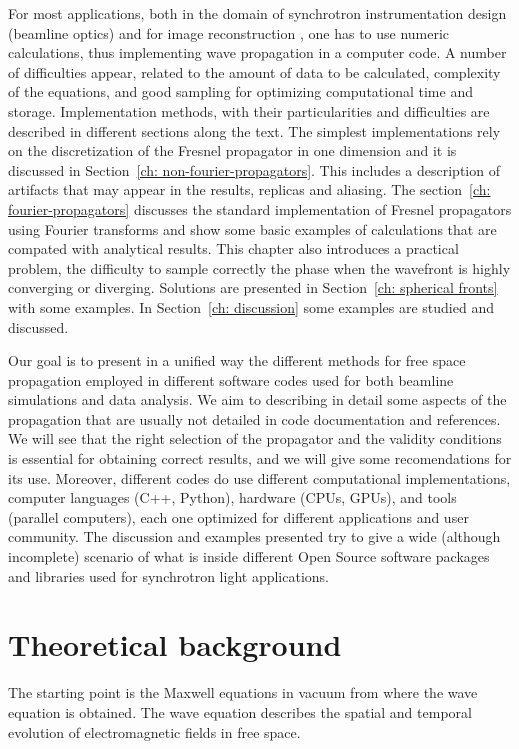 \documentclass{iucr}              %
\begin{document}
For most applications, both in the domain of synchrotron instrumentation design (beamline optics) and for image reconstruction \cite{maiden_josaa_2012,gilles_optica_2018}, one has to use numeric calculations, thus implementing wave propagation in a computer code. A number of difficulties appear, related to the amount of data to be calculated, complexity of the equations, and good sampling for optimizing computational time and storage. Implementation methods, with their particularities and difficulties are described in different sections along the text. The simplest implementations rely on the discretization of the Fresnel propagator in one dimension and it is discussed in Section~\ref{ch: non-fourier-propagators}. This includes a description of artifacts that may appear in the results, replicas and aliasing. The section~\ref{ch: fourier-propagators} discusses the standard implementation of Fresnel propagators using Fourier transforms and show some basic examples of calculations that are compated with analytical results. This chapter also introduces a practical problem, the difficulty to sample correctly the phase when the wavefront is highly converging or diverging. Solutions are presented in Section~\ref{ch: spherical fronts} with some examples. In Section~\ref{ch: discussion} some examples are studied and discussed.

Our goal is to present in a unified way the different methods for free space propagation employed in different software codes used for both beamline simulations and data analysis. We aim to describing in detail some aspects of the propagation that are usually not detailed in code documentation and references. We will see that the right selection of the propagator and the validity conditions is essential for obtaining correct results, and we will give some recomendations for its use. Moreover, different codes do use different computational implementations, computer languages (C++, Python), hardware (CPUs, GPUs), and tools (parallel computers), each one optimized for different applications and user community. The discussion and examples presented try to give a wide (although incomplete) scenario of what is inside different Open Source software packages and libraries used for synchrotron light applications.   

\section{Theoretical background}
\label{ch: theory}

The starting point is the Maxwell equations in vacuum from where the wave equation is obtained. The wave equation describes the spatial and temporal evolution of electromagnetic fields in free space. 
\end{document}
